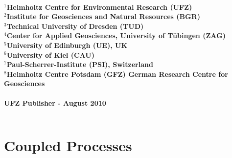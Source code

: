 \documentclass[twoside]{report} %
\begin{document}
\subsubsection*{$^1$Helmholtz Centre for Environmental Research (UFZ)\\[0.75ex]
$^2$Institute for Geosciences and Natural Resources (BGR)\\[0.75ex]
$^3$Technical University of Dresden (TUD)\\[0.75ex]
$^4$Center for Applied Geosciences, University of T\"ubingen (ZAG)\\[0.75ex]
$^5$University of Edinburgh (UE), UK\\[0.75ex]
$^6$University of Kiel (CAU)\\[0.75ex]
$^7$Paul-Scherrer-Institute (PSI), Switzerland\\[0.75ex]
$^8$Helmholtz Centre Potsdam (GFZ) German Research Centre for Geosciences
}

\vfill
\subsubsection*{\centering UFZ Publisher - August 2010}

\tableofcontents \thispagestyle{empty}













\newpage $ $ \thispagestyle{empty}
\chapter*{Coupled Processes}
\newpage








\appendix



%
%


\end{document}
